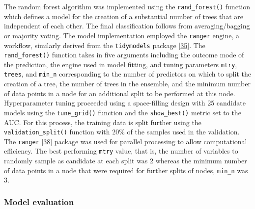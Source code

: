 \documentclass[
  10pt,
]{article}
\begin{document}
The random forest algorithm was implemented using the \texttt{rand\_forest()} function which defines a model for the creation of a substantial number of trees that are independent of each other. The final classification follows from averaging/bagging or majority voting. The model implementation employed the \texttt{ranger} engine, a workflow, similarly derived from the \texttt{tidymodels} package {[}\protect\hyperlink{ref-kuhn2020}{35}{]}. The \texttt{rand\_forest()} function takes in five arguments including the outcome mode of the prediction, the engine used in model fitting, and tuning parameters \texttt{mtry}, \texttt{trees}, and \texttt{min\_n} corresponding to the number of predictors on which to split the creation of a tree, the number of trees in the ensemble, and the minimum number of data points in a node for an additional split to be performed at this node. Hyperparameter tuning proceeded using a space-filling design with 25 candidate models using the \texttt{tune\_grid()} function and the \texttt{show\_best()} metric set to the AUC. For this process, the training data is split further using the \texttt{validation\_split()} function with 20\% of the samples used in the validation. The \texttt{ranger} {[}\protect\hyperlink{ref-wright2017}{38}{]} package was used for parallel processing to allow computational efficiency. The best performing \texttt{mtry} value, that is, the number of variables to randomly sample as candidate at each split was 2 whereas the minimum number of data points in a node that were required for further splits of nodes, \texttt{min\_n} was 3.

\hypertarget{performance}{%
\subsubsection{Model evaluation}\label{performance}}
\end{document}
